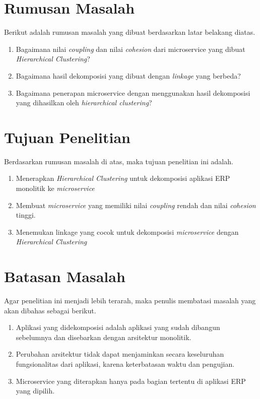 \hfill \break

\section{Rumusan Masalah}
Berikut adalah rumusan masalah yang dibuat berdasarkan latar belakang diatas.
\begin{enumerate}[nolistsep,leftmargin=0.5cm]
  \item Bagaimana nilai \textit{coupling} dan nilai \textit{cohesion} dari microservice yang dibuat \textit{Hierarchical Clustering}?
  \item Bagaimana hasil dekomposisi yang dibuat dengan \textit{linkage} yang berbeda?
  \item Bagaimana penerapan microservice dengan menggunakan hasil dekomposisi yang dihasilkan oleh \textit{hierarchical clustering}?\\
\end{enumerate}

\section{Tujuan Penelitian}
Berdasarkan rumusan masalah di atas, maka tujuan penelitian ini adalah.
\begin{enumerate}[nolistsep,leftmargin=0.5cm]
  \item Menerapkan \textit{Hierarchical Clustering} untuk dekomposisi aplikasi ERP monolitik ke \textit{microservice}
  \item Membuat \textit{microservice} yang memiliki nilai \textit{coupling} rendah dan nilai \textit{cohesion} tinggi.
  \item Menemukan linkage yang  cocok untuk dekomposisi \textit{microservice} dengan \textit{Hierarchical Clustering} \\
\end{enumerate}

\section{Batasan Masalah}
Agar penelitian ini menjadi lebih terarah, maka penulis membatasi masalah yang akan dibahas sebagai berikut.
\begin{enumerate}[nolistsep,leftmargin=0.5cm]
  \item Aplikasi yang didekomposisi adalah aplikasi yang sudah dibangun sebelumnya dan disebarkan dengan arsitektur monolitik.
  \item Perubahan arsitektur tidak dapat menjaminkan secara keseluruhan fungsionalitas dari aplikasi, karena keterbatasan waktu dan pengujian.
  \item Microservice yang diterapkan hanya pada bagian tertentu di aplikasi ERP yang dipilih.\\
\end{enumerate}

